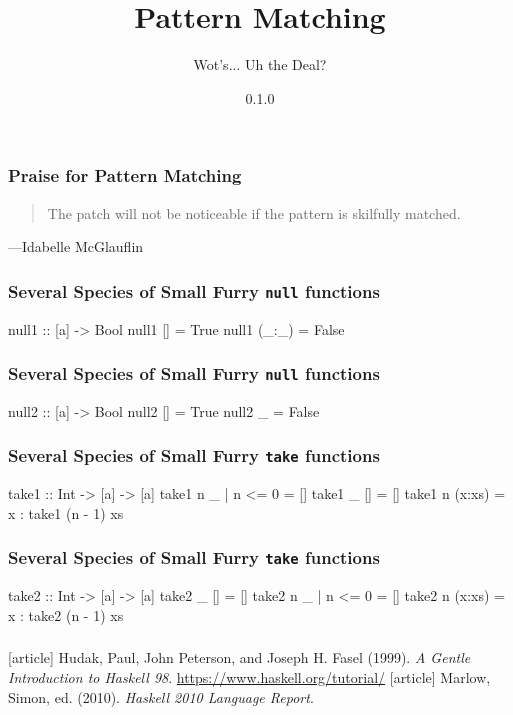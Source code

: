\documentclass{beamer}
\title{Pattern Matching}
\subtitle{Wot's... Uh the Deal?}
\author{}
\institute{Stack Builders}
\date{0.1.0}
\begin{document}
\frame{\titlepage}

\begin{frame}
  \frametitle{Praise for Pattern Matching}


  \begin{quote}
    The patch will not be noticeable if the pattern is skilfully
    matched.
  \end{quote}
  \hfill ---Idabelle McGlauflin
\end{frame}

\begin{frame}[fragile]
  \frametitle{Several Species of Small Furry \texttt{null} functions}

  \begin{code}
null1 :: [a] -> Bool
null1 []    = True
null1 (_:_) = False
  \end{code}
\end{frame}

\begin{frame}[fragile]
  \frametitle{Several Species of Small Furry \texttt{null} functions}

  \begin{code}
null2 :: [a] -> Bool
null2 []    = True
null2 _     = False
  \end{code}
\end{frame}

\begin{frame}[fragile]
  \frametitle{Several Species of Small Furry \texttt{take} functions}

  \begin{code}
take1 :: Int -> [a] -> [a]
take1 n _      | n <= 0 = []
take1 _ []              = []
take1 n (x:xs)          = x : take1 (n - 1) xs
  \end{code}
\end{frame}

\begin{frame}[fragile]
  \frametitle{Several Species of Small Furry \texttt{take} functions}

  \begin{code}
take2 :: Int -> [a] -> [a]
take2 _ []              = []
take2 n _      | n <= 0 = []
take2 n (x:xs)          = x : take2 (n - 1) xs
  \end{code}
\end{frame}

\begin{frame}
  \frametitle{}

  \begin{thebibliography}{}
  [article]
    Hudak, Paul, John Peterson, and Joseph H. Fasel (1999).
    \newblock \emph{A Gentle Introduction to Haskell 98}.
    \newblock \url{https://www.haskell.org/tutorial/}
  [article]
    Marlow, Simon, ed. (2010).
    \newblock \emph{Haskell 2010 Language Report}.
  \end{thebibliography}
\end{frame}
\end{document}
